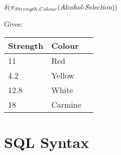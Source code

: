 $\delta(\pi_{Strength, Colour}(\text{\it Alcohol-Selection}))$

Gives:

\begin{center}
  \begin{tabular}{lll}
    {Strength} & {Colour}\\ \hline
    11                & Red\\
    4.2               & Yellow\\
    12.8              & White\\
    18                & Carmine\\
  \end{tabular}
\end{center}

\section{SQL Syntax}

